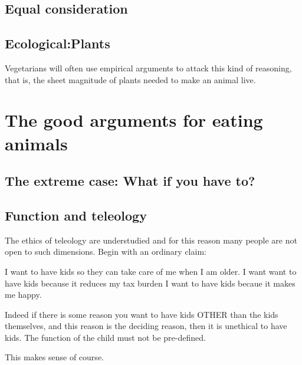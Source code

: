 \section{Equal consideration}

\section{Ecological:Plants}

Vegetarians will often use empirical arguments to attack this kind of reasoning, that is, the sheet magnitude of plants needed to make an animal live. 


\chapter{The good arguments for eating animals}

\section{The extreme case: What if you have to?}

\section{Function and teleology}

The ethics of teleology are understudied and for this reason many people are not open to such dimensions. Begin with an ordinary claim:

I want to have kids so they can take care of me when I am older.
I want want to have kids because it reduces my tax burden
I want to have kids becaue it makes me happy. 

Indeed if there is some reason you want to have kids OTHER than the kids themselves, and this reason is the deciding reason, then it is unethical to have kids. The function of the child must not be pre-defined. 

This makes sense of course. 

